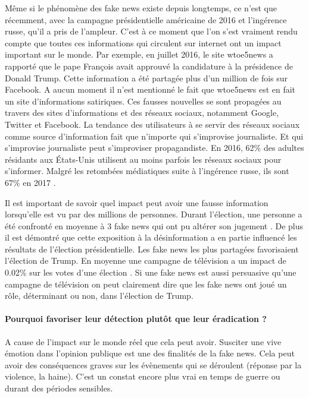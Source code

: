 Même si le phénomène des fake news existe depuis longtemps, ce n'est que récemment, avec la campagne présidentielle américaine de 2016 et l'ingérence russe, qu'il a pris de l'ampleur. C'est à ce moment que l'on s'est vraiment rendu compte que toutes ces informations qui circulent sur internet ont un impact important sur le monde. Par exemple, en juillet 2016, le site wtoe5news a rapporté que le pape François avait approuvé la candidature à la présidence de Donald Trump. Cette information a été partagée plus d'un million de fois sur Facebook. A aucun moment il n'est mentionné le fait que wtoe5news est en fait un site d'informations satiriques. Ces fausses nouvelles se sont propagées au travers des sites d'informations et des réseaux sociaux, notamment Google, Twitter et Facebook. La tendance des utilisateurs à se servir des réseaux sociaux comme source d'information fait que n'importe qui s'improvise journaliste. Et qui s'improvise journaliste peut s'improviser propagandiste. En 2016, 62\% des adultes résidants aux États-Unis utilisent au moins parfois les réseaux sociaux pour s'informer. Malgré les retombées médiatiques suite à l'ingérence russe, ils sont 67\% en 2017 \cite{news_across_platforms_2017}.

Il est important de savoir quel impact peut avoir une fausse information lorsqu'elle est vu par des millions de personnes. Durant l'élection, une personne a été confronté en moyenne à 3 fake news qui ont pu altérer son jugement \cite{allcott2017social}. De plus il est démontré que cette exposition à la désinformation a en partie influencé les résultats de l'élection présidentielle. Les fake news les plus partagées favorisaient l'élection de Trump. En moyenne une campagne de télévision a un impact de 0.02\% sur les votes d'une élection \cite{spenkuch2016political}. Si une fake news est aussi persuasive qu'une campagne de télévision on peut clairement dire que les fake news ont joué un rôle, déterminant ou non, dans l'élection de Trump.

\paragraph{Pourquoi favoriser leur détection plutôt que leur éradication ?} A cause de l'impact sur le monde réel que cela peut avoir. Susciter une vive émotion dans l'opinion publique est une des finalités de la fake news. Cela peut avoir des conséquences graves sur les évènements qui se déroulent (réponse par la violence, la haine). C'est un constat encore plus vrai en temps de guerre ou durant des périodes sensibles.

